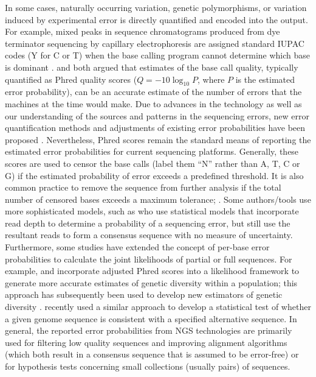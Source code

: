 \documentclass[10pt]{article}
\begin{document}
In some cases, naturally occurring variation, \ie genetic polymorphisms, or variation induced by experimental error is directly quantified and encoded into the output.
For example, mixed peaks in sequence chromatograms produced from dye terminator sequencing by capillary electrophoresis are assigned standard IUPAC codes (\eg Y for C or T) when the base calling program cannot determine which base is dominant \citep{NomenclatureIncompletelySpecified1986}.
\citet{ewingBaseCallingAutomatedSequencer1998} and \citet{richterichEstimationErrorsRaw1998} both argued that estimates of the base call quality, typically quantified as Phred quality scores ($Q=-10 \log_{10} P$, where $P$ is the estimated error probability), can be an accurate estimate of the number of errors that the machines at the time would make.
Due to advances in the technology as well as our understanding of the sources and patterns in the sequencing errors, new error quantification methods and adjustments of existing error probabilities have been proposed \citep{liAdjustQualityScores2004, liSNPDetectionMassively2009, depristoFrameworkVariationDiscovery2011}. 
Nevertheless, Phred scores remain the standard means of reporting the estimated error probabilities for current sequencing platforms.
Generally, these scores are used to censor the base calls (\ie label them ``N'' rather than A, T, C or G) if the estimated probability of error exceeds a predefined threshold.
It is also common practice to remove the sequence from further analysis if the total number of censored bases exceeds a maximum tolerance; \eg \citet{doroninaPhylogeneticPositionEmended2005, robaskyRoleReplicatesError2014,oraweAccountingUncertaintyDNA2015}.
Some authors/tools use more sophisticated models, such as \citet{wuEstimatingErrorModels2017} who use statistical models that incorporate read depth to determine a probability of a sequencing error, but still use the resultant reads to form a consensus sequence with no measure of uncertainty.
Furthermore, some studies have extended the concept of per-base error probabilities to calculate the joint likelihoods of partial or full sequences.
For example, \citet{depristoFrameworkVariationDiscovery2011} and \citet{gompertHierarchicalBayesianModel2011} incorporate adjusted Phred scores into a likelihood framework to generate more accurate estimates of genetic diversity within a population; this approach has subsequently been used to develop new estimators of genetic diversity \citep{fumagalliQuantifyingPopulationGenetic2013a}. 
\citet{kuoEAGLEExplicitAlternative2018} recently used a similar approach to develop a statistical test of whether a given genome sequence is consistent with a specified alternative sequence.
In general, the reported error probabilities from NGS technologies are primarily used for filtering low quality sequences and improving alignment algorithms (which both result in a consensus sequence that is assumed to be error-free) or for hypothesis tests concerning small collections (usually pairs) of sequences.
\end{document}
